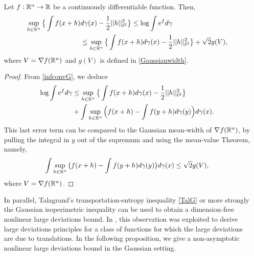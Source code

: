 \documentclass[a4paper,oneside,11pt]{article}
\begin{document}
\begin{Pro}\label{meanfieldG}
Let $f : \mathbb{R}^n\to \mathbb{R}$ be a continuously differentiable function. Then,
\begin{align*}
\sup_{h\in \mathbb{R}^n} \big\{ \int f(x+h) &d\gamma(x) -\frac{1}{2}||h||_{\ell^2}^2\big\} \leq \log \int e^{f} d\gamma\\
& \leq \sup_{h\in \mathbb{R}^n} \big\{ \int f(x+h) d\gamma(x) -\frac{1}{2}||h||_{\ell^2}^2\big\} + \sqrt{2}g(V),
\end{align*}
where $V = \nabla f (\mathbb{R}^n)$ and $g(V)$ is defined in \eqref{Gaussianwidth}.
\end{Pro}
\begin{proof} 
From \eqref{infconvG}, we deduce
\begin{align*}
\log \int e^f d\gamma &\leq  \sup_{h\in \mathbb{R}^n} \big\{ \int f(x+h) d\gamma(x) -\frac{1}{2}||h||_{\ell^2}^2\big\} \\
&+  \int \sup_{h\in \mathbb{R}^n}\Big( f(x+h) -\int f(y+h)d\gamma(y)\Big) d\gamma(x).\end{align*}
This last error term can be compared to the Gaussian mean-width of $\nabla f(\mathbb{R}^n)$, by pulling the integral in $y$ out of the supremum and using the mean-value Theorem, namely,
$$ \int \sup_{h\in \mathbb{R}^n} \big( f(x+h) - \int f(y+h)d\gamma(y) \big) d\gamma(x)\leq \sqrt{2}g(V), $$
where $V = \nabla f(\mathbb{R}^n)$. 
\end{proof}

In parallel, Talagrand's transportation-entropy inequality \eqref{TalG} or more strongly the Gaussian isoperimetric inequality can be used to obtain a dimension-free nonlinear large deviations bound. In \cite{LDPWG}, this observation was exploited to derive large deviations principles for a class of functions for which the large deviations are due to translations. In the following proposition, we give a non-asymptotic nonlinear large deviations bound in the Gaussian setting. 
\end{document}
